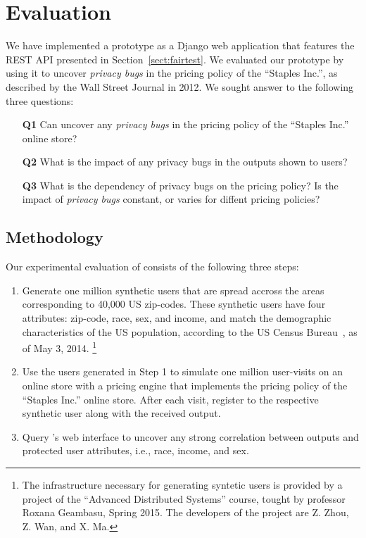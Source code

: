 \section{Evaluation}
\label{sect:evaluation}

We have implemented a \sysname prototype as a Django web application
that features the REST API presented in Section~\ref{sect:fairtest}.
We evaluated our prototype by using it to uncover {\it privacy bugs}
in the pricing policy of the ``Staples Inc.'', as described by the
Wall Street Journal in 2012. We sought answer to the following three
questions:

\begin{enumerate}
  \item[{\bf Q1}] Can \sysname uncover any {\em privacy bugs} in the
    pricing policy of the ``Staples Inc.'' online store?
  \item[{\bf Q2}] What is the impact of any privacy bugs in the outputs
    shown to users?
  \item[{\bf Q3}] What is the dependency of privacy bugs on the 
    pricing policy? Is the impact of {\em privacy bugs} constant,
    or varies for diffent pricing policies?
\end{enumerate}

\subsection{\normalsize Methodology}
Our experimental evaluation of \sysname consists of the following three steps:

\begin{enumerate}
  \item
  Generate one million synthetic users that are spread accross the
  areas corresponding to 40,000 US zip-codes. These synthetic users
  have four attributes: zip-code, race, sex, and income, and match
  the demographic characteristics of the US population, according to
  the US Census Bureau~\cite{CensusBureau}, as of May 3, 2014.
  \footnote{
    The infrastructure necessary for generating syntetic users is
    provided by a project of the ``Advanced Distributed Systems'' course,
    tought by professor Roxana Geambasu, Spring 2015. The developers of the
    project are Z. Zhou, Z. Wan, and X. Ma.
  }

  \item
  Use the users generated in Step 1 to simulate one million user-visits on
  an online store with a pricing engine that implements the pricing policy of
  the ``Staples Inc.'' online store. After each visit, register to \sysname
  the respective synthetic user along with the received output.

  \item
  Query \sysname's web interface to uncover any strong correlation between
  outputs and protected user attributes, i.e., race, income, and sex.
\end{enumerate}

